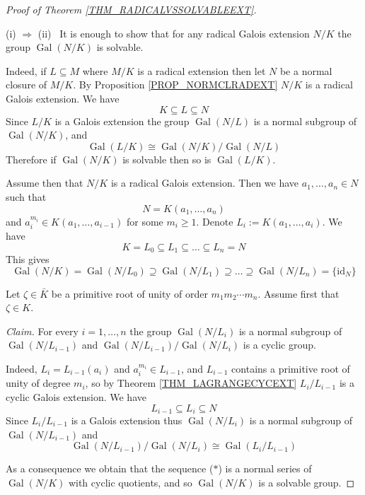 \documentclass[12pt, letterpaper, oneside]{article}
\theoremstyle{plain}
\theoremstyle{definition}
\newcommand{\id}{\mathrm{id}}
\newcommand{\Gal}{\operatorname{Gal}}
\newcommand{\vs}{\vskip 5mm}
\begin{document}
\begin{proof}[Proof of Theorem \ref{THM_RADICALVSSOLVABLEEXT}]\ 

(i) $\Rightarrow$ (ii) \ It is enough to show that for any radical Galois extension 
$N/K$ the group $\Gal(N/K)$ is solvable. 

Indeed, if $L\subseteq M$ where $M/K$ is a radical extension then let 
$N$ be a normal closure of $M/K$. By Proposition \ref{PROP_NORMCLRADEXT}
$N/K$ is a radical Galois extension. We have 
$$K\subseteq L \subseteq N$$
Since $L/K$ is a Galois extension the group $\Gal(N/L)$ is a normal subgroup of 
$\Gal(N/K)$, and 
$$\Gal(L/K)\cong \Gal(N/K)/ \Gal(N/L)$$ 
Therefore if $\Gal(N/K)$ is solvable then so is $\Gal(L/K)$. 

\vs 

Assume then that $N/K$ is a radical Galois extension. Then we have 
 $a_{1}, \dots, a_{n}\in N$  such that
$$N= K(a_{1}, \dots, a_{n})$$
and  $a_{i}^{m_{i}}\in K(a_{1}, \dots, a_{i-1})$
for some  $m_{i}\geq 1$.  Denote $L_{i} := K(a_{1}, \dots, a_{i})$. We have 
$$K= L_{0}\subseteq L_{1} \subseteq {\dots}\subseteq L_{n} = N$$
This gives 
\begin{equation*}
\tag{$\ast$}
\Gal(N/K) = \Gal(N/L_{0}) \supseteq \Gal(N/L_{1}) \supseteq  
{\dots} \supseteq \Gal(N/L_{n}) = \{\id_{N}\} 
\end{equation*}


Let $\zeta\in \bar{K}$ be a primitive root of unity of order $m_{1}m_{2}\cdots m_{n}$. 
Assume first that $\zeta\in K$. 


\vs

\emph{Claim.} For every $i=1, \dots, n$ the group $\Gal(N/L_{i})$ is a normal subgroup of 
$\Gal(N/L_{i-1})$ and $\Gal(N/L_{i-1})/\Gal(N/L_{i})$ is a cyclic group. 

Indeed, $L_{i} = L_{i-1}(a_{i})$ and $a_{i}^{m_{i}}\in L_{i-1}$, and $L_{i-1}$ contains
a primitive root of unity of degree $m_{i}$,  so by Theorem \ref{THM_LAGRANGECYCEXT} 
$L_{i}/L_{i-1}$ is a cyclic Galois extension. We have 
$$ L_{i-1} \subseteq L_{i} \subseteq N$$
Since $L_{i}/L_{i-1}$ is a Galois extension thus $\Gal(N/L_{i})$ is a normal subgroup of 
$\Gal(N/L_{i-1})$ and 
$$\Gal(N/L_{i-1})/\Gal(N/L_{i})\cong \Gal(L_{i}/L_{i-1})$$



As a consequence we obtain that the sequence ($\ast$) is a normal series of $\Gal(N/K)$
with cyclic quotients, and so $\Gal(N/K)$ is a solvable group. 




\end{proof}
\end{document}
